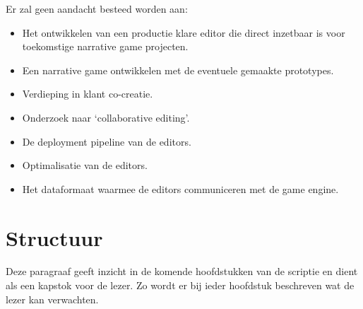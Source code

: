 \noindent Er zal geen aandacht besteed worden aan:
\begin{itemize}
    \item Het ontwikkelen van een productie klare editor die direct inzetbaar is voor toekomstige narrative game projecten.
    \item Een narrative game ontwikkelen met de eventuele gemaakte prototypes.
    \item Verdieping in klant co-creatie.
    \item Onderzoek naar ‘collaborative editing’.
    \item De deployment pipeline van de editors.
    \item Optimalisatie van de editors.
    \item Het dataformaat waarmee de editors communiceren met de game engine.
\end{itemize}

\pagebreak
\section{Structuur}
Deze paragraaf geeft inzicht in de komende hoofdstukken van de scriptie en dient als een kapstok voor de lezer. Zo wordt er bij ieder hoofdstuk beschreven wat de lezer kan verwachten.

